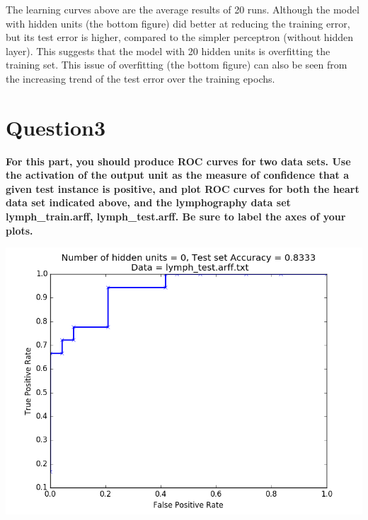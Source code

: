 \documentclass[paper=a4, fontsize=11pt]{scrartcl} %
\numberwithin{equation}{section} %
\numberwithin{figure}{section} %
\numberwithin{table}{section} %
\begin{document}
The learning curves above are the average results of 20 runs. Although the model with hidden units (the bottom figure) did better at reducing the training error, but its test error is higher, compared to the simpler perceptron (without hidden layer). This suggests that the model with 20 hidden units is overfitting the training set. This issue of overfitting (the bottom figure) can also be seen from the increasing trend of the test error over the training epochs. 


\newpage
\section*{Question3}
\textbf{For this part, you should produce ROC curves for two data sets. Use the activation of the output unit as the measure of confidence that a given test instance is positive, and plot ROC curves for both the heart data set indicated above, and the lymphography data set lymph\_train.arff, lymph\_test.arff. Be sure to label the axes of your plots.}

\begin{center}
\includegraphics[scale=.5]{pics/roc_noHidden.png}
\end{center}
\end{document}
